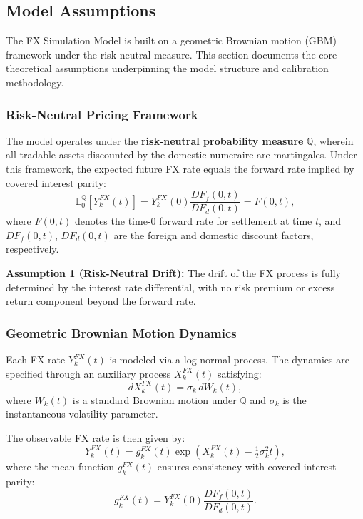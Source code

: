 \subsection{Model Assumptions}

The FX Simulation Model is built on a geometric Brownian motion (GBM) framework under the risk-neutral measure. This section documents the core theoretical assumptions underpinning the model structure and calibration methodology.

\subsubsection{Risk-Neutral Pricing Framework}

The model operates under the \textbf{risk-neutral probability measure} $\mathbb{Q}$, wherein all tradable assets discounted by the domestic numeraire are martingales. Under this framework, the expected future FX rate equals the forward rate implied by covered interest parity:
\begin{equation}
	\mathbb{E}^{\mathbb{Q}}_0\left[Y_k^{FX}(t)\right] = Y_k^{FX}(0)\frac{DF_f(0,t)}{DF_d(0,t)} = F(0,t),
\end{equation}
where $F(0,t)$ denotes the time-0 forward rate for settlement at time $t$, and $DF_f(0,t)$, $DF_d(0,t)$ are the foreign and domestic discount factors, respectively.

\textbf{Assumption 1 (Risk-Neutral Drift):} The drift of the FX process is fully determined by the interest rate differential, with no risk premium or excess return component beyond the forward rate.

\subsubsection{Geometric Brownian Motion Dynamics}

Each FX rate $Y_k^{FX}(t)$ is modeled via a log-normal process. The dynamics are specified through an auxiliary process $X_k^{FX}(t)$ satisfying:
\begin{equation}
	dX_k^{FX}(t) = \sigma_k\,dW_k(t),
\end{equation}
where $W_k(t)$ is a standard Brownian motion under $\mathbb{Q}$ and $\sigma_k$ is the instantaneous volatility parameter.

The observable FX rate is then given by:
\begin{equation}
	Y_k^{FX}(t) = g_k^{FX}(t)\exp\!\left(X_k^{FX}(t) - \tfrac{1}{2}\sigma_k^2 t\right),
\end{equation}
where the mean function $g_k^{FX}(t)$ ensures consistency with covered interest parity:
\begin{equation}
	g_k^{FX}(t) = Y_k^{FX}(0)\frac{DF_f(0,t)}{DF_d(0,t)}.
\end{equation}

